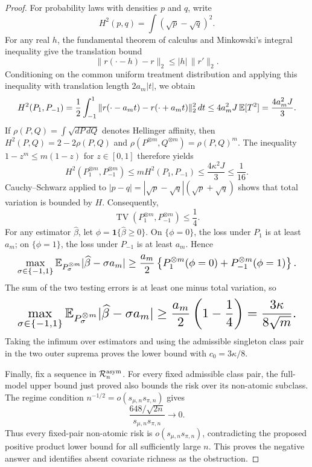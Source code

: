 \documentclass{article}
\begin{document}
\begin{proof}
For probability laws with densities \(p\) and \(q\), write
\[
H^2(p,q)=\int(\sqrt p-\sqrt q)^2.
\]
For any real \(h\), the fundamental theorem of calculus and Minkowski's integral inequality give the translation bound
\[
\|r(\cdot-h)-r\|_2\le|h|\,\|r'\|_2.
\]
Conditioning on the common uniform treatment distribution and applying this inequality with translation length \(2a_m|t|\), we obtain
\[
\makebox[\linewidth][c]{\resizebox{0.98\linewidth}{!}{\par\noindent \makebox[\linewidth][c]{\resizebox{0.98\linewidth}{!}{\(\displaystyle \displaystyle H^2(P_1,P_{-1})=\frac12\int_{-1}^1\|r(\cdot-a_mt)-r(\cdot+a_mt)\|_2^2\,dt\le4a_m^2J\,\mathbb E[T^2]=\frac{4a_m^2J}{3}.\)}}\par\noindent}}
\]
If \(\rho(P,Q)=\int\sqrt{dP\,dQ}\) denotes Hellinger affinity, then \(H^2(P,Q)=2-2\rho(P,Q)\) and \(\rho(P^{\otimes m},Q^{\otimes m})=\rho(P,Q)^m\). The inequality \(1-z^m\le m(1-z)\) for \(z\in[0,1]\) therefore yields
\[
H^2(P_1^{\otimes m},P_{-1}^{\otimes m})\le mH^2(P_1,P_{-1})\le\frac{4\kappa^2J}{3}\le\frac1{16}.
\]
Cauchy--Schwarz applied to \(|p-q|=|\sqrt p-\sqrt q|(\sqrt p+\sqrt q)\) shows that total variation is bounded by \(H\). Consequently,
\[
\operatorname{TV}(P_1^{\otimes m},P_{-1}^{\otimes m})\le\frac14.
\]
For any estimator \(\widehat\beta\), let \(\phi=\mathbf 1\{\widehat\beta\ge0\}\). On \(\{\phi=0\}\), the loss under \(P_1\) is at least \(a_m\); on \(\{\phi=1\}\), the loss under \(P_{-1}\) is at least \(a_m\). Hence
\[
\makebox[\linewidth][c]{\resizebox{0.98\linewidth}{!}{\par\noindent \makebox[\linewidth][c]{\resizebox{0.98\linewidth}{!}{\(\displaystyle \displaystyle \max_{\sigma\in\{-1,1\}}\mathbb E_{P_\sigma^{\otimes m}}|\widehat\beta-\sigma a_m|\ge\frac{a_m}{2}\left\{P_1^{\otimes m}(\phi=0)+P_{-1}^{\otimes m}(\phi=1)\right\}.\)}}\par\noindent}}
\]
The sum of the two testing errors is at least one minus total variation, so
\[
\makebox[\linewidth][c]{\resizebox{0.98\linewidth}{!}{\par\noindent \makebox[\linewidth][c]{\resizebox{0.98\linewidth}{!}{\(\displaystyle \displaystyle \max_{\sigma\in\{-1,1\}}\mathbb E_{P_\sigma^{\otimes m}}|\widehat\beta-\sigma a_m|\ge\frac{a_m}{2}\left(1-\frac14\right)=\frac{3\kappa}{8\sqrt m}.\)}}\par\noindent}}
\]
Taking the infimum over estimators and using the admissible singleton class pair in the two outer suprema proves the lower bound with \(c_0=3\kappa/8\).

Finally, fix a sequence in \(\mathcal R_n^{\rm asym}\). For every fixed admissible class pair, the full-model upper bound just proved also bounds the risk over its non-atomic subclass. The regime condition \(n^{-1/2}=o(s_{\mu,n}s_{\pi,n})\) gives
\[
\frac{648/\sqrt{2n}}{s_{\mu,n}s_{\pi,n}}\longrightarrow0.
\]
Thus every fixed-pair non-atomic risk is \(o(s_{\mu,n}s_{\pi,n})\), contradicting the proposed positive product lower bound for all sufficiently large \(n\). This proves the negative answer and identifies absent covariate richness as the obstruction.
\end{proof}
\end{document}

